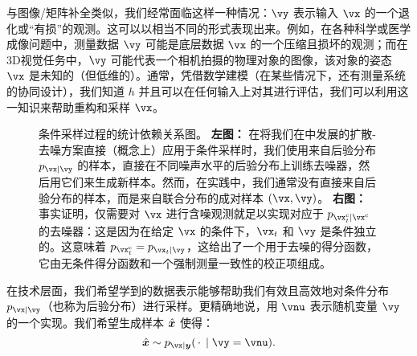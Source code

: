 \documentclass[../../book-main.tex]{subfiles}
\begin{document}
与图像/矩阵补全类似，我们经常面临这样一种情况：$\vy$ 表示输入 $\vx$ 的一个退化或“有损”的观测。这可以以相当不同的形式表现出来。例如，在各种科学或医学成像问题中，测量数据 $\vy$ 可能是底层数据 $\vx$ 的一个压缩且损坏的观测；而在3D视觉任务中，$\vy$ 可能代表一个相机拍摄的物理对象的图像，该对象的姿态 $\vx$ 是未知的（但低维的）。通常，凭借数学建模（在某些情况下，还有测量系统的协同设计），我们知道 $h$ 并且可以在任何输入上对其进行评估，我们可以利用这一知识来帮助重构和采样 $\vx$。

\begin{figure}[t]
  \centering
  \begin{subfigure}{0.45\textwidth}
    \vspace{0.75cm}
    \centering
    \vspace{0.75cm}
    \caption{}
    \label{fig:left}
  \end{subfigure}
  \hfill
  \begin{subfigure}{0.45\textwidth}
    \centering
    \caption{}
    \label{fig:right}
  \end{subfigure}
  \caption{条件采样过程的统计依赖关系图。
  \textbf{左图：} 在将我们在中发展的扩散-去噪方案直接（概念上）应用于条件采样时，我们使用来自后验分布 $p_{\vx \mid \vy}$ 的样本，直接在不同噪声水平的后验分布上训练去噪器，然后用它们来生成新样本。然而，在实践中，我们通常没有直接来自后验分布的样本，而是来自联合分布的成对样本 $(\vx, \vy)$。
  \textbf{右图：} 事实证明，仅需要对 $\vx$ 进行含噪观测就足以实现对应于 $p_{\posteriorsample_t \mid \posteriorsample}$ 的去噪器：这是因为在给定 $\vx$ 的条件下，$\vx_t$ 和 $\vy$ 是条件独立的。这意味着 $p_{\posteriorsample_t} = p_{\vx_t \mid \vy}$，这给出了一个用于去噪的得分函数，它由无条件得分函数和一个强制测量一致性的校正项组成。}
  \label{fig:posterior-sampling-cds}
\end{figure}


在技术层面，我们希望学到的数据表示能够帮助我们有效且高效地对条件分布 $p_{\vx\mid \vy}$（也称为后验分布）进行采样。更精确地说，用 $\vnu$ 表示随机变量 $\vy$ 的一个实现。我们希望生成样本 $\hat{\bm{x}}$ 使得：
\begin{equation}\label{eq:goal-sample-posterior}
  \hat{\x} \sim   p_{\vx \mid \y}(\spcdot \mid \vy=\vnu).
\end{equation}
\end{document}
